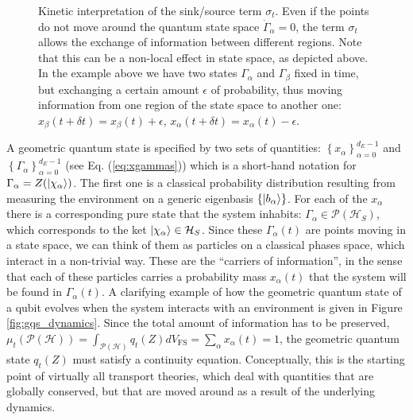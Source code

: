 \documentclass[draft,nofootinbib,pre,twocolumn,showpacs,showkeys,preprintnumbers,floatfix]{revtex4-1}
\newcommand{\1}{\mathbbm{1}}
\newcommand{\PH}{\mathcal{P}(\mathcal{H})}
\begin{document}
\begin{figure}[t!]
\begin{minipage}[t]{.45\textwidth}
\caption{Kinetic interpretation of the sink/source term $\sigma_t$. Even if the points do not move around
	the quantum state space $\dot{\Gamma}_\alpha=0$, the term $\sigma_t$ allows the exchange of information 
	between different regions. Note that this can be a non-local effect in state space, as depicted above. In the 
	example above	we have two states $\Gamma_\alpha$ and $\Gamma_\beta$ fixed in time, but exchanging 
	a certain amount $\epsilon$ of probability, thus moving information from one region of the state space to 
	another one: $x_\beta(t+\delta t) = x_\beta(t)+\epsilon$, $x_\alpha(t+\delta t) 	= x_\alpha(t) - \epsilon$.
	}
\label{fig:sigma_term}
\end{minipage}
\end{figure}
A geometric quantum state is specified by two sets of quantities: $\left\{x_\alpha\right\}_{\alpha=0}^{d_E-1}$
and $\left\{ \Gamma_\alpha\right\}_{\alpha=0}^{d_E-1}$ (see Eq. (\ref{eq:xgammas})) which is a short-hand notation for 
$\Gamma_\alpha = Z(\ket{\chi_\alpha})$. The first one is a classical probability distribution
resulting from measuring the environment on a generic eigenbasis $\left\{\ket{b_\alpha} \right\}$. For each of the $x_\alpha$
there is a corresponding pure state that the system inhabits: $\Gamma_\alpha \in \mathcal{P}(\mathcal{H}_S)$,
which corresponds to the ket $\ket{\chi_\alpha} \in \mathcal{H}_S$. Since these $\Gamma_\alpha(t)$ are points moving 
in a state space, we can think of them as particles on a classical phases space, 
which interact in a non-trivial way. These are the ``carriers of information'', in the sense that each of 
these particles carries a probability mass $x_\alpha(t)$ that the system will be found in $\Gamma_\alpha(t)$.
A clarifying example of how the geometric quantum state of a qubit evolves when the system 
interacts with an environment is given in Figure \ref{fig:gqs_dynamics}. Since the total amount 
of information has to be preserved, $\mu_t(\PH) = \int_{\PH} q_t(Z) dV_{\mathrm{FS}} = \sum_\alpha x_\alpha(t) =1$,
the geometric quantum state $q_t(Z)$ must satisfy a continuity equation. Conceptually, this is 
the starting point of virtually all transport theories, which deal with quantities that are globally 
conserved, but that are moved around as a result of the underlying dynamics.
\end{document}
